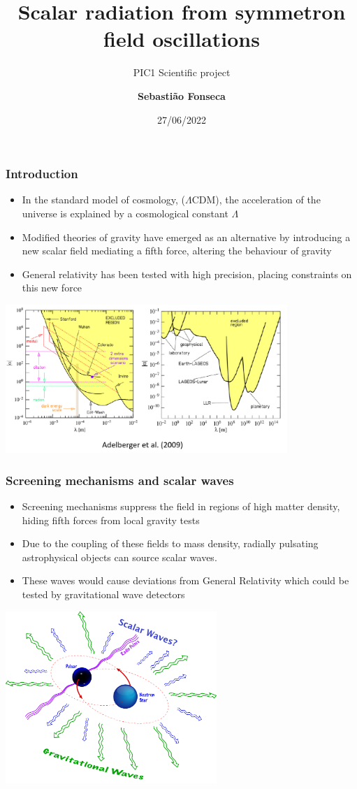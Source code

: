 \documentclass[10pt,t,handout]{beamer}
\title{Scalar radiation from symmetron field oscillations}
\subtitle{\small PIC1 Scientific project}
\author{\textbf{Sebastião Fonseca}}
\institute{Under the supervision of Javier Rubio \\ \,  \\ Departamento de Física \\Instituto Superior Técnico - ULisboa}
\date{27/06/2022}
\begin{document}
\frame{\titlepage}

\begin{frame}
\frametitle{Introduction}
\begin{itemize}[<+->]
    \item \small In the standard model of cosmology, ($\Lambda$CDM), the acceleration of the universe is explained by a cosmological constant $\Lambda$
    \item \small Modified theories of gravity have emerged as an alternative by introducing a new scalar field mediating a fifth force, altering the behaviour of gravity
    \item \small General relativity has been tested with high precision, placing constraints on this new force
   
\end{itemize}
\centering\includegraphics[width=0.8\textwidth]{Images/Constraints.png}
     
\end{frame}
\begin{frame}
\frametitle{Screening mechanisms and scalar waves}
\begin{itemize}[<+->]
    \item \small Screening mechanisms suppress the field in regions of high matter density, hiding fifth forces from local gravity tests
    \item \small Due to the coupling of these fields to mass density, radially pulsating astrophysical objects can source scalar waves.
    \item \small These waves would cause deviations from General Relativity which could be tested by gravitational wave detectors 
    
\end{itemize}
\centering\includegraphics[width=0.6\textwidth]{Images/Final.png}
     
\end{frame}
\end{document}

